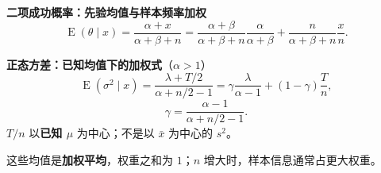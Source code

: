 \documentclass[UTF8,a4paper,fontset=windows]{ctexart}
\newcommand{\E}{\operatorname{E}}
\begin{document}
{\begin{minipage}[t]{.487\textwidth}
\textbf{二项成功概率：先验均值与样本频率加权}
\[
 \E(\theta\mid x)=\frac{\alpha+x}{\alpha+\beta+n}
 =\frac{\alpha+\beta}{\alpha+\beta+n}\frac \alpha{\alpha+\beta}+\frac n{\alpha+\beta+n}\frac xn.
\]

\textbf{正态方差：已知均值下的加权式}（$\alpha>1$）
\[
 \E(\sigma^2\mid x)=\frac{\lambda+T/2}{\alpha+n/2-1}
 =\gamma\frac \lambda{\alpha-1}+(1-\gamma)\frac Tn,
\]
\[
 \gamma=\frac{\alpha-1}{\alpha+n/2-1}.
\]
$T/n$ 以\textbf{已知 $\mu$} 为中心；不是以 $\bar x$ 为中心的 $s^2$。

这些均值是\textbf{加权平均}，权重之和为 $1$；$n$ 增大时，样本信息通常占更大权重。
\end{minipage}}
\noindent\usebox{\leftbody}\hfill\usebox{\rightbody}
\end{document}
